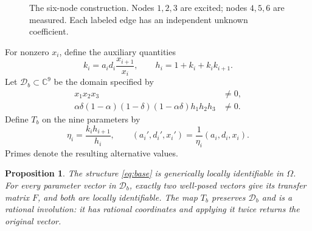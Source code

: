 \documentclass[letterpaper,10pt,conference]{ieeeconf}
\newtheorem{proposition}{Proposition}
\begin{document}
\begin{figure}[t]
\centering
{}
\caption{The six-node construction. Nodes \(1,2,3\) are excited;
nodes \(4,5,6\) are measured. Each labeled edge has an independent
unknown coefficient.}
\label{fig:base}
\end{figure}

For nonzero \(x_i\), define the auxiliary quantities
\begin{equation}\label{eq:auxiliary}
 k_i=a_id_i\frac{x_{i+1}}{x_i},\qquad h_i=1+k_i+k_ik_{i+1}.
\end{equation}
Let \(\mathcal D_b\subset\mathbb C^9\) be the domain specified by
\begin{equation}\label{eq:base-domain}
\begin{split}
 x_1x_2x_3&\ne0,\\
 \alpha\delta(1-\alpha)(1-\delta)(1-\alpha\delta)h_1h_2h_3&\ne0.
\end{split}
\end{equation}
Define \(T_b\) on the nine parameters by
\begin{equation}\label{eq:alternative}
 \eta_i=\frac{k_ih_{i+1}}{h_i},\qquad
 (a_i',d_i',x_i')=\frac1{\eta_i}(a_i,d_i,x_i).
\end{equation}
Primes denote the resulting alternative values.

\begin{proposition}\label{prop:base}
The structure \eqref{eq:base} is generically locally identifiable in
\(\Omega\). For every parameter vector in \(\mathcal D_b\), exactly
two well-posed vectors give its transfer matrix \(F\), and both are
locally identifiable. The map \(T_b\) preserves \(\mathcal D_b\) and
is a rational involution: it has rational coordinates and applying it
twice returns the original vector.
\end{proposition}
\end{document}
